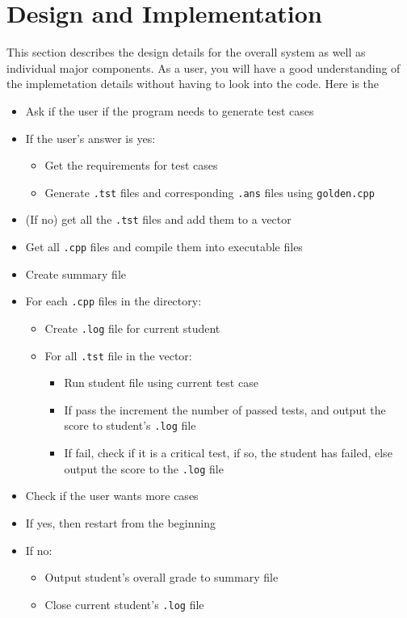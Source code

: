 \chapter{Design  and Implementation}
 This section describes the design details for the overall system as well as individual major components. As a user, you will have a good understanding of the implemetation details without having to look into the code. Here is the  


\begin{itemize}
  \item Ask if the user if the program needs to generate test cases
  \item If the user's answer is yes: 
	 \begin{itemize}
		\item Get the requirements for test cases
 	 	\item Generate {\tt.tst} files and corresponding {\tt .ans} files using {\tt golden.cpp}
	\end{itemize}
  \item (If no) get all the {\tt .tst} files and add them to a vector 
  \item Get all {\tt .cpp} files and compile them into executable files
  \item Create summary file
  \item For each {\tt .cpp} files in the directory: 
 	\begin{itemize}
 		\item Create {\tt .log} file for current student
		\item For all {\tt .tst} file in the vector:
		\begin{itemize}
			 \item Run student file using current test case
 			\item If pass the increment the number of passed tests, and output the score to student's {\tt .log} file
			 \item If fail, check if it is a critical test, if so, the student has failed, else output the score to the {\tt .log} file
		\end{itemize}
	\end{itemize}
  \item Check if the user wants more cases
  \item If yes, then restart from the beginning
  \item If no:
	\begin{itemize}
  		\item Output student's overall grade to summary file
  		\item Close current student's {\tt .log} file	
	\end{itemize}
  

\end{itemize}
